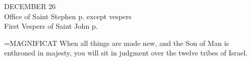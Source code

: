 \begin{center}\normalsize DECEMBER 26\\
\footnotesize Office of Saint Stephen p. \pageref{propers:stephen} except vespers\\
\footnotesize First Vespers of Saint John p. \pageref{propers:john}\\
\end{center}

\hangindent=\parindent \small{MAGNIFICAT 	When all things are made new, and the Son of Man is enthroned in majesty, you will sit in judgment over the twelve tribes of Israel.\\}

